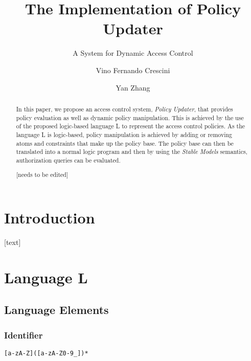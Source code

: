 \documentclass{llncs}
\begin{document}
  \long{}

  \title{The Implementation of Policy Updater}
  \subtitle{A System for Dynamic Access Control}

  \author{Vino Fernando Crescini \and Yan Zhang}


  \maketitle

  \begin{abstract}
    In this paper, we propose an access control system, \emph{Policy Updater},
    that provides policy evaluation as well as dynamic policy manipulation.
    This is achieved by the use of the proposed logic-based language L to
    represent the access control policies. As the language L is logic-based,
    policy manipulation is achieved by adding or removing atoms and constraints
    that make up the policy base. The policy base can then be translated into a
    normal logic program and then by using the \emph{Stable Models} semantics,
    authorization queries can be evaluated.

    [needs to be edited]
  \end{abstract}

  \section{Introduction}
    [text]

  \section{Language L}
    \subsection{Language Elements}

      \subsubsection{Identifier}
        \begin{verbatim}
[a-zA-Z]([a-zA-Z0-9_])*
        \end{verbatim}
\end{document}
